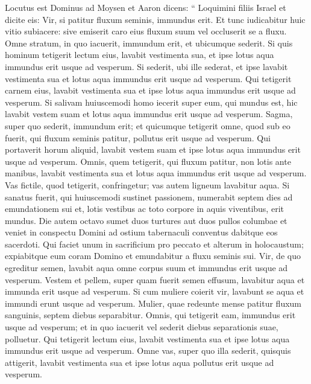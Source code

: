 \begin{biblechapter}
\begin{biblechapter}
\begin{biblechapter}
\begin{biblechapter}
\begin{biblechapter}
\begin{biblechapter}
\begin{biblechapter}
\begin{biblechapter}
\begin{biblechapter}
\begin{biblechapter}
\begin{biblechapter}
\begin{biblechapter}
\begin{biblechapter}
\begin{biblechapter}
\begin{biblechapter}
\verse Locutus est Dominus ad Moysen et Aaron dicens: 
\verse “ Loquimini filiis Israel et dicite eis: Vir, si patitur fluxum seminis, immundus erit. 
\verse Et tunc iudicabitur huic vitio subiacere: sive emiserit caro eius fluxum suum vel occluserit se a fluxu. 
\verse Omne stratum, in quo iacuerit, immundum erit, et ubicumque sederit. 
\verse Si quis hominum tetigerit lectum eius, lavabit vestimenta sua, et ipse lotus aqua immundus erit usque ad vesperum. 
\verse Si sederit, ubi ille sederat, et ipse lavabit vestimenta sua et lotus aqua immundus erit usque ad vesperum. 
\verse Qui tetigerit carnem eius, lavabit vestimenta sua et ipse lotus aqua immundus erit usque ad vesperum. 
\verse Si salivam huiuscemodi homo iecerit super eum, qui mundus est, hic lavabit vestem suam et lotus aqua immundus erit usque ad vesperum. 
\verse Sagma, super quo sederit, immundum erit; 
 \verse et quicumque tetigerit omne, quod sub eo fuerit, qui fluxum seminis patitur, pollutus erit usque ad vesperum. Qui portaverit horum aliquid, lavabit vestem suam et ipse lotus aqua immundus erit usque ad vesperum. 
\verse Omnis, quem tetigerit, qui fluxum patitur, non lotis ante manibus, lavabit vestimenta sua et lotus aqua immundus erit usque ad vesperum. 
\verse Vas fictile, quod tetigerit, confringetur; vas autem ligneum lavabitur aqua.
 \verse Si sanatus fuerit, qui huiuscemodi sustinet passionem, numerabit septem dies ad emundationem sui et, lotis vestibus ac toto corpore in aquis viventibus, erit mundus. 
\verse Die autem octavo sumet duos turtures aut duos pullos columbae et veniet in conspectu Domini ad ostium tabernaculi conventus dabitque eos sacerdoti. 
\verse Qui faciet unum in sacrificium pro peccato et alterum in holocaustum; expiabitque eum coram Domino et emundabitur a fluxu seminis sui.
 \verse Vir, de quo egreditur semen, lavabit aqua omne corpus suum et immundus erit usque ad vesperum. 
\verse Vestem et pellem, super quam fuerit semen effusum, lavabitur aqua et immunda erit usque ad vesperum.
 \verse Si cum muliere coierit vir, lavabunt se aqua et immundi erunt usque ad vesperum.
 \verse Mulier, quae redeunte mense patitur fluxum sanguinis, septem diebus separabitur. Omnis, qui tetigerit eam, immundus erit usque ad vesperum; 
\verse et in quo iacuerit vel sederit diebus separationis suae, polluetur. 
\verse Qui tetigerit lectum eius, lavabit vestimenta sua et ipse lotus aqua immundus erit usque ad vesperum. 
\verse Omne vas, super quo illa sederit, quisquis attigerit, lavabit vestimenta sua et ipse lotus aqua pollutus erit usque ad vesperum. 

\end{biblechapter}
\end{biblechapter}
\end{biblechapter}
\end{biblechapter}
\end{biblechapter}
\end{biblechapter}
\end{biblechapter}
\end{biblechapter}
\end{biblechapter}
\end{biblechapter}
\end{biblechapter}
\end{biblechapter}
\end{biblechapter}
\end{biblechapter}
\end{biblechapter}
